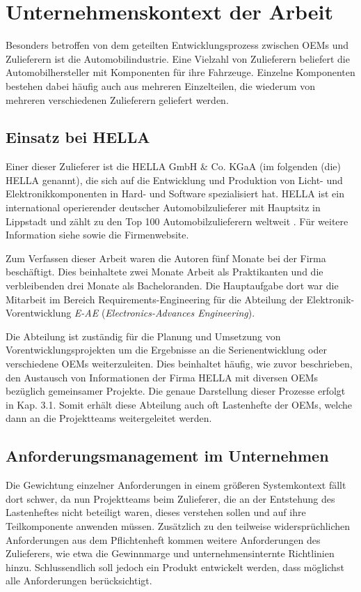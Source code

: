 \documentclass[12pt]{report}
\begin{document}
\section[Unternehmenskontext]{Unternehmenskontext der Arbeit}
Besonders betroffen von dem geteilten Entwicklungsprozess zwischen OEMs und Zulieferern ist die Automobilindustrie. Eine Vielzahl von Zulieferern beliefert die Automobilhersteller mit Komponenten für ihre Fahrzeuge. Einzelne Komponenten bestehen dabei häufig auch aus mehreren Einzelteilen, die wiederum von mehreren verschiedenen Zulieferern geliefert werden. \cite{awk06}

\subsection{Einsatz bei HELLA}
Einer dieser Zulieferer ist die HELLA GmbH \& Co. KGaA (im folgenden (die) HELLA genannt), die sich auf die Entwicklung und Produktion von Licht- und Elektronikkomponenten in Hard- und Software spezialisiert hat. HELLA ist ein international operierender deutscher Automobilzulieferer mit Hauptsitz in Lippstadt und zählt zu den Top 100 Automobilzulieferern weltweit \cite{lv10}. Für weitere Information siehe \cite{he19} sowie die Firmenwebsite. 

Zum Verfassen dieser Arbeit waren die Autoren fünf Monate bei der Firma beschäftigt. Dies beinhaltete zwei Monate Arbeit als Praktikanten und die verbleibenden drei Monate als Bacheloranden. 
Die Hauptaufgabe dort war die Mitarbeit im Bereich Requirements-Engineering für die Abteilung der Elektronik-Vorentwicklung \textit{E-AE} (\textit{Electronics-Advances Engineering}). 

Die Abteilung ist zuständig für die Planung und Umsetzung von Vorentwicklungsprojekten um die Ergebnisse an die Serienentwicklung oder verschiedene OEMs weiterzuleiten. Dies beinhaltet häufig, wie zuvor beschrieben, den Austausch von Informationen der Firma HELLA mit diversen OEMs bezüglich gemeinsamer Projekte. Die genaue Darstellung dieser Prozesse erfolgt in Kap. 3.1. Somit erhält diese Abteilung auch oft Lastenhefte der OEMs, welche dann an die Projektteams weitergeleitet werden. 

\subsection{Anforderungsmanagement im Unternehmen}
Die Gewichtung einzelner Anforderungen in einem größeren Systemkontext fällt dort schwer, da nun Projektteams beim Zulieferer, die an der Entstehung des Lastenheftes nicht beteiligt waren, dieses verstehen sollen und auf ihre Teilkomponente anwenden müssen. Zusätzlich zu den teilweise widersprüchlichen Anforderungen aus dem Pflichtenheft kommen weitere Anforderungen des Zulieferers, wie etwa die Gewinnmarge und unternehmensinternte Richtlinien hinzu. Schlussendlich soll jedoch ein Produkt entwickelt werden, dass möglichst alle Anforderungen berücksichtigt. \cite{mw02}
\end{document}
